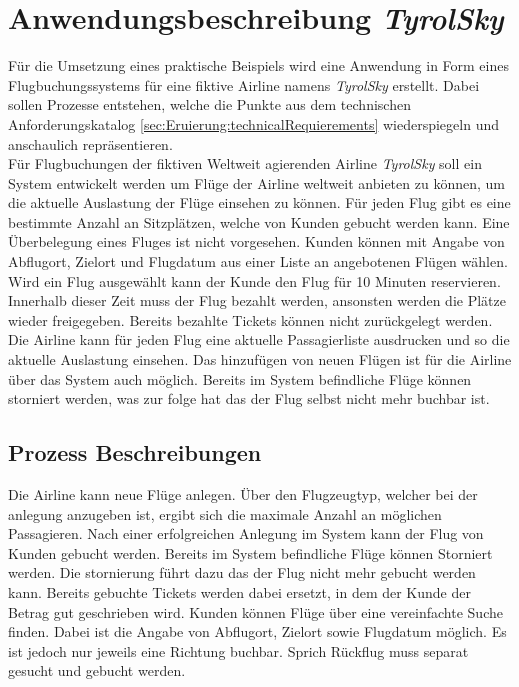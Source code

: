 \section{Anwendungsbeschreibung \textit{TyrolSky}}
Für die Umsetzung eines praktische Beispiels wird eine Anwendung in Form eines Flugbuchungssystems für eine fiktive Airline namens \textit{TyrolSky} erstellt. Dabei sollen Prozesse entstehen, welche die Punkte aus dem technischen Anforderungskatalog \ref{sec:Eruierung:technicalRequierements} wiederspiegeln und anschaulich repräsentieren. \\
Für Flugbuchungen der fiktiven Weltweit agierenden Airline \textit{TyrolSky} soll ein System entwickelt werden um Flüge der Airline weltweit anbieten zu können, um die aktuelle Auslastung der Flüge einsehen zu können. Für jeden Flug gibt es eine bestimmte Anzahl an Sitzplätzen, welche von Kunden gebucht werden kann. Eine Überbelegung eines Fluges ist nicht vorgesehen. Kunden können mit Angabe von Abflugort, Zielort und Flugdatum aus einer Liste an angebotenen Flügen wählen. Wird ein Flug ausgewählt kann der Kunde den Flug für 10 Minuten reservieren. Innerhalb dieser Zeit muss der Flug bezahlt werden, ansonsten werden die Plätze wieder freigegeben. Bereits bezahlte Tickets können nicht zurückgelegt werden.  \\
Die Airline kann für jeden Flug eine aktuelle Passagierliste ausdrucken und so die aktuelle Auslastung einsehen. Das hinzufügen von neuen Flügen ist für die Airline über das System auch möglich. Bereits im System befindliche Flüge können storniert werden, was zur folge hat das der Flug selbst nicht mehr buchbar ist. \\

\subsection{Prozess Beschreibungen}
\begin{enumerate}
     Die Airline kann neue Flüge anlegen. Über den Flugzeugtyp, welcher bei der anlegung anzugeben ist, ergibt sich die maximale Anzahl an möglichen Passagieren. Nach einer erfolgreichen Anlegung im System kann der Flug von Kunden gebucht werden.
     Bereits im System befindliche Flüge können Storniert werden. Die stornierung führt dazu das der Flug nicht mehr gebucht werden kann. Bereits gebuchte Tickets werden dabei ersetzt, in dem der Kunde der Betrag gut  geschrieben wird.
    Kunden können Flüge über eine vereinfachte Suche finden. Dabei ist die Angabe von Abflugort, Zielort sowie Flugdatum möglich. Es ist jedoch nur jeweils eine Richtung buchbar. Sprich Rückflug muss separat gesucht und gebucht werden. 
    
\end{enumerate}

